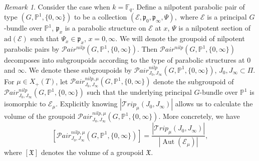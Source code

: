 \documentclass{amsart}
\newcommand{\cE}{\mathcal{E}}
\theoremstyle{plain}
\theoremstyle{definition}
\theoremstyle{remark}
\newtheorem{remark}{Remark}[section]
\DeclareMathOperator{\aut}{Aut}
\begin{document}
\begin{remark}
Consider the case when $k=\mathbb{F}_{q}$. Define a nilpotent parabolic pair of type $(G,\mathbb{P}^{1},\{0,\infty\})$ to be a collection $(\cE,\mathfrak{p}_{0},\mathfrak{p}_{\infty},\Psi),$ where $\cE$ is a principal $G$-bundle over $\mathbb{P}^{1}$, $\mathfrak{p}_{x}$ is a parabolic structure on $\cE$ at $x$, $\Psi$ is a nilpotent section of $\text{ad}(\cE)$ such that $\Psi_{x}\in\mathfrak{p}_{x}$, $x=0,\infty$. 
We will denote the groupoid of nilpotent parabolic pairs by $\mathcal{P}air^{nilp}(G,\mathbb{P}^{1},\{0,\infty\})$. Then $\mathcal{P}air^{nilp}(G,\mathbb{P}^{1},\{0,\infty\})$ decomposes into subgroupoids according to the type of parabolic structures at $0$ and $\infty$. We denote these subgroupoids by $\mathcal{P}air^{nilp}_{J_{0},J_{\infty}}(G,\mathbb{P}^{1},\{0,\infty\})$, $J_{0},J_{\infty}\subset\Pi$. For $\mu\in X_{+}(T)$, let $\mathcal{P}air^{nilp,\mu}_{J_{0},J_{\infty}}(G,\mathbb{P}^{1},\{0,\infty\})$ denote the subgroupoid of $\mathcal{P}air^{nilp}_{J_{0},J_{\infty}}(G,\mathbb{P}^{1},\{0,\infty\})$ such that the underlying principal $G$-bundle over $\mathbb{P}^1$ is isomorphic to $\cE_\mu$. Explicitly knowing $|\mathcal{T}rip_{\mu}(J_{0},J_{\infty})|$ allows us to calculate the volume of the groupoid $\mathcal{P}air^{nilp,\mu}_{J_{0},J_{\infty}}(G,\mathbb{P}^{1},\{0,\infty\})$. More concretely, we have 
\[
[\mathcal{P}air^{nilp,\mu}_{J_{0},J_{\infty}}(G,\mathbb{P}^{1},\{0,\infty\})]=\frac{|\mathcal{T}rip_{\mu}(J_{0},J_{\infty})|}{|\aut(\cE_{\mu})|},
\]
where $[\mathfrak{X}]$ denotes the volume of a groupoid $\mathfrak{X}$.
\end{remark}
\end{document}
